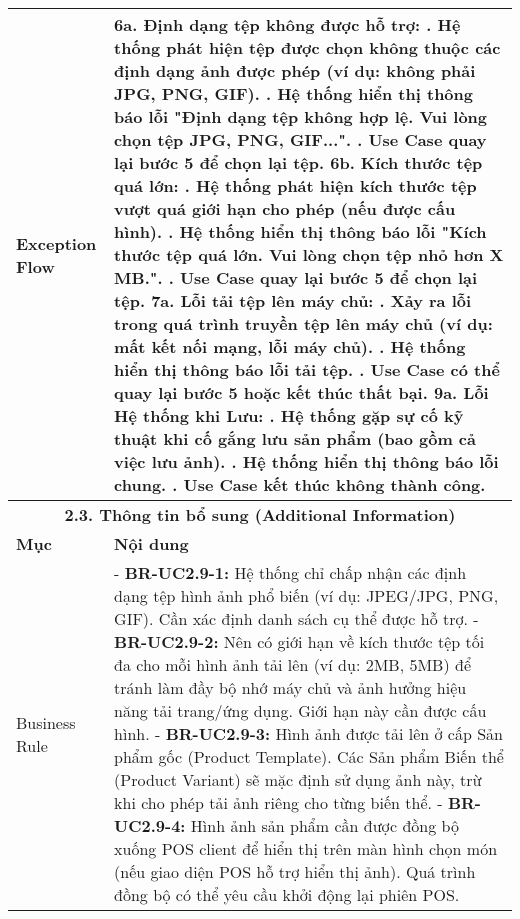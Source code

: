 \begin{longtable}{|m{4cm}|p{11cm}|}
Exception Flow & \textbf{6a. Định dạng tệp không được hỗ trợ:} \newline    1. Hệ thống phát hiện tệp được chọn không thuộc các định dạng ảnh được phép (ví dụ: không phải JPG, PNG, GIF). \newline    2. Hệ thống hiển thị thông báo lỗi "Định dạng tệp không hợp lệ. Vui lòng chọn tệp JPG, PNG, GIF...". \newline    3. Use Case quay lại bước 5 để chọn lại tệp. \newline \textbf{6b. Kích thước tệp quá lớn:} \newline    1. Hệ thống phát hiện kích thước tệp vượt quá giới hạn cho phép (nếu được cấu hình). \newline    2. Hệ thống hiển thị thông báo lỗi "Kích thước tệp quá lớn. Vui lòng chọn tệp nhỏ hơn X MB.". \newline    3. Use Case quay lại bước 5 để chọn lại tệp. \newline \textbf{7a. Lỗi tải tệp lên máy chủ:} \newline    1. Xảy ra lỗi trong quá trình truyền tệp lên máy chủ (ví dụ: mất kết nối mạng, lỗi máy chủ). \newline    2. Hệ thống hiển thị thông báo lỗi tải tệp. \newline    3. Use Case có thể quay lại bước 5 hoặc kết thúc thất bại. \newline \textbf{9a. Lỗi Hệ thống khi Lưu:} \newline    1. Hệ thống gặp sự cố kỹ thuật khi cố gắng lưu sản phẩm (bao gồm cả việc lưu ảnh). \newline    2. Hệ thống hiển thị thông báo lỗi chung. \newline    3. Use Case kết thúc không thành công. \\
\hline
\multicolumn{2}{|c|}{\textbf{2.3. Thông tin bổ sung (Additional Information)}} \\
\hline
\textbf{Mục} & \textbf{Nội dung} \\
\hline
Business Rule & - \textbf{BR-UC2.9-1:} Hệ thống chỉ chấp nhận các định dạng tệp hình ảnh phổ biến (ví dụ: JPEG/JPG, PNG, GIF). Cần xác định danh sách cụ thể được hỗ trợ. \newline - \textbf{BR-UC2.9-2:} Nên có giới hạn về kích thước tệp tối đa cho mỗi hình ảnh tải lên (ví dụ: 2MB, 5MB) để tránh làm đầy bộ nhớ máy chủ và ảnh hưởng hiệu năng tải trang/ứng dụng. Giới hạn này cần được cấu hình. \newline - \textbf{BR-UC2.9-3:} Hình ảnh được tải lên ở cấp Sản phẩm gốc (Product Template). Các Sản phẩm Biến thể (Product Variant) sẽ mặc định sử dụng ảnh này, trừ khi cho phép tải ảnh riêng cho từng biến thể. \newline - \textbf{BR-UC2.9-4:} Hình ảnh sản phẩm cần được đồng bộ xuống POS client để hiển thị trên màn hình chọn món (nếu giao diện POS hỗ trợ hiển thị ảnh). Quá trình đồng bộ có thể yêu cầu khởi động lại phiên POS. \\

\end{longtable}

